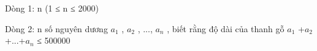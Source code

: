 Dòng 1: n (1 ≤ n ≤ 2000)

Dòng 2: n số nguyên dương $a_{1}$ , $a_{2}$ , ..., $a_{n}$ , biết rằng độ dài của thanh gỗ $a_{1}$ +$a_{2}$ +...+$a_{n}$ ≤ 500000